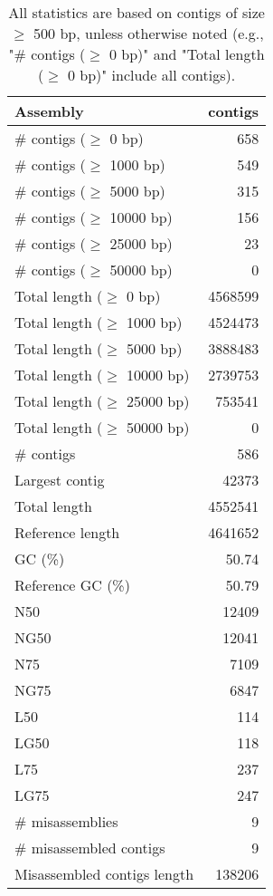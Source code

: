 \documentclass[12pt,a4paper]{article}
\begin{document}
\begin{table}[ht]
\begin{center}
\caption{All statistics are based on contigs of size $\geq$ 500 bp, unless otherwise noted (e.g., "\# contigs ($\geq$ 0 bp)" and "Total length ($\geq$ 0 bp)" include all contigs).}
\begin{tabular}{|l*{1}{|r}|}
\hline
Assembly & contigs \\ \hline
\# contigs ($\geq$ 0 bp) & 658 \\ \hline
\# contigs ($\geq$ 1000 bp) & 549 \\ \hline
\# contigs ($\geq$ 5000 bp) & 315 \\ \hline
\# contigs ($\geq$ 10000 bp) & 156 \\ \hline
\# contigs ($\geq$ 25000 bp) & 23 \\ \hline
\# contigs ($\geq$ 50000 bp) & 0 \\ \hline
Total length ($\geq$ 0 bp) & 4568599 \\ \hline
Total length ($\geq$ 1000 bp) & 4524473 \\ \hline
Total length ($\geq$ 5000 bp) & 3888483 \\ \hline
Total length ($\geq$ 10000 bp) & 2739753 \\ \hline
Total length ($\geq$ 25000 bp) & 753541 \\ \hline
Total length ($\geq$ 50000 bp) & 0 \\ \hline
\# contigs & 586 \\ \hline
Largest contig & 42373 \\ \hline
Total length & 4552541 \\ \hline
Reference length & 4641652 \\ \hline
GC (\%) & 50.74 \\ \hline
Reference GC (\%) & 50.79 \\ \hline
N50 & 12409 \\ \hline
NG50 & 12041 \\ \hline
N75 & 7109 \\ \hline
NG75 & 6847 \\ \hline
L50 & 114 \\ \hline
LG50 & 118 \\ \hline
L75 & 237 \\ \hline
LG75 & 247 \\ \hline
\# misassemblies & 9 \\ \hline
\# misassembled contigs & 9 \\ \hline
Misassembled contigs length & 138206 \\ \hline

\end{tabular}
\end{center}
\end{table}
\end{document}
